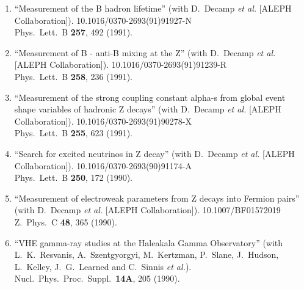 \begin{enumerate}
\item ``Measurement of the B hadron lifetime'' (with D.~Decamp {\it et al.}  [ALEPH Collaboration]). 10.1016/0370-2693(91)91927-N
\\{}Phys.\ Lett.\ B {\bf 257}, 492 (1991). %


\item ``Measurement of B - anti-B mixing at the Z'' (with D.~Decamp {\it et al.}  [ALEPH Collaboration]). 10.1016/0370-2693(91)91239-R
\\{}Phys.\ Lett.\ B {\bf 258}, 236 (1991). %


\item ``Measurement of the strong coupling constant alpha-s from global event shape variables of hadronic Z decays'' (with D.~Decamp {\it et al.}  [ALEPH Collaboration]). 10.1016/0370-2693(91)90278-X
\\{}Phys.\ Lett.\ B {\bf 255}, 623 (1991). %


\item ``Search for excited neutrinos in Z decay'' (with D.~Decamp {\it et al.}  [ALEPH Collaboration]). 10.1016/0370-2693(90)91174-A
\\{}Phys.\ Lett.\ B {\bf 250}, 172 (1990). %


\item ``Measurement of electroweak parameters from Z decays into Fermion pairs'' (with D.~Decamp {\it et al.}  [ALEPH Collaboration]). 10.1007/BF01572019
\\{}Z.\ Phys.\ C {\bf 48}, 365 (1990). %


\item ``VHE gamma-ray studies at the Haleakala Gamma Observatory'' (with L.~K.~Resvanis, A.~Szentgyorgyi, M.~Kertzman, P.~Slane, J.~Hudson, L.~Kelley, J.~G.~Learned and C.~Sinnis {\it et al.}). Nucl.\ Phys.\ Proc.\ Suppl.\  {\bf 14A}, 205 (1990). %

\end{enumerate}



